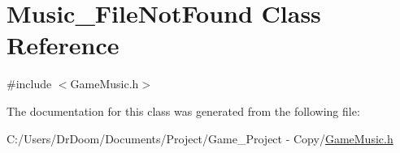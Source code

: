 \hypertarget{class_music___file_not_found}{}\section{Music\+\_\+\+File\+Not\+Found Class Reference}
\label{class_music___file_not_found}


{\ttfamily \#include $<$Game\+Music.\+h$>$}



The documentation for this class was generated from the following file\+:\begin{DoxyCompactItemize}
\item 
C\+:/\+Users/\+Dr\+Doom/\+Documents/\+Project/\+Game\+\_\+\+Project -\/ Copy/\hyperlink{_game_music_8h}{Game\+Music.\+h}\end{DoxyCompactItemize}
